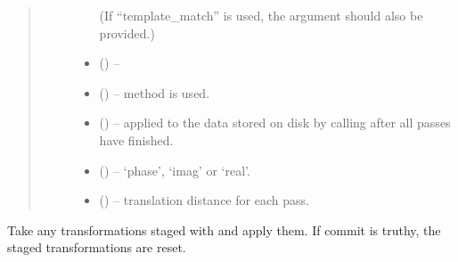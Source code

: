 \documentclass[letterpaper,10pt,english]{sphinxmanual}
\begin{document}
\begin{fulllineitems}
\begin{fulllineitems}
\begin{quote}
\begin{description}
\begin{itemize}
\begin{itemize}
\end{itemize}

(If ``template\_match'' is used, the  argument should
also be provided.)


\item {} 
 () -- 

\item {} 
 () --  method is used.

\item {} 
 (\sphinxstyleliteralemphasis{ (}\sphinxstyleliteralemphasis{)}\sphinxstyleliteralemphasis{}\sphinxstyleliteralemphasis{, }) -- applied to the data stored on disk by calling
 after all passes have
finished.

\item {} 
 (\sphinxstyleliteralemphasis{,}\sphinxstyleliteralemphasis{}) -- `phase', `imag' or `real'.

\item {} 
 (\sphinxstyleliteralemphasis{ (}\sphinxstyleliteralemphasis{)}\sphinxstyleliteralemphasis{}\sphinxstyleliteralemphasis{, }) -- translation distance for each pass.

\end{itemize}

\end{description}\end{quote}

\end{fulllineitems}


\begin{fulllineitems}
\label{\detokenize{xanespy:xanespy.xanes_frameset.XanesFrameset.apply_transformations}}
Take any transformations staged with 
and apply them. If commit is truthy, the staged
transformations are reset.


\end{fulllineitems}
\end{fulllineitems}
\end{document}
